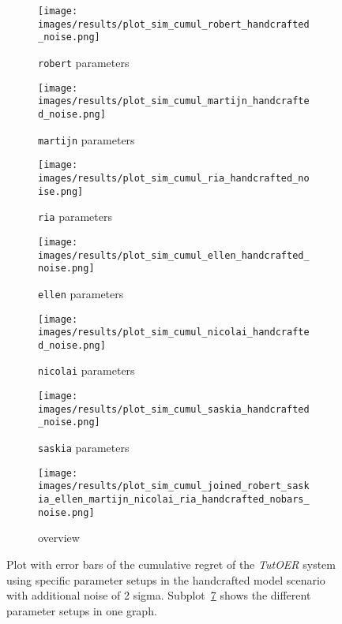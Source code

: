 
\begin{figure}[ht]
	\begin{subfigure}{0.48\linewidth}
	\texttt{[image: images/results/plot\_sim\_cumul\_robert\_handcrafted\_noise.png]}
	\caption{\texttt{robert} parameters}
	\label{fig:cumul_handcrafted_noise_robert}
	\end{subfigure}
	\hfill
	\begin{subfigure}{0.48\linewidth}
	\texttt{[image: images/results/plot\_sim\_cumul\_martijn\_handcrafted\_noise.png]}
	\caption{\texttt{martijn} parameters}
	\label{fig:cumul_handcrafted_noise_martijn}
	\end{subfigure}
	\begin{subfigure}{0.48\linewidth}
	\texttt{[image: images/results/plot\_sim\_cumul\_ria\_handcrafted\_noise.png]}
	\caption{\texttt{ria} parameters}
	\label{fig:cumul_handcrafted_noise_ria}
	\end{subfigure}
	\hfill
	\begin{subfigure}{0.48\linewidth}
	\texttt{[image: images/results/plot\_sim\_cumul\_ellen\_handcrafted\_noise.png]}
	\caption{\texttt{ellen} parameters}
	\label{fig:cumul_handcrafted_noise_ellen}
	\end{subfigure}
	\begin{subfigure}{0.48\linewidth}
	\texttt{[image: images/results/plot\_sim\_cumul\_nicolai\_handcrafted\_noise.png]}
	\caption{\texttt{nicolai} parameters}
	\label{fig:cumul_handcrafted_noise_nicolai}
	\end{subfigure}
	\hfill
	\begin{subfigure}{0.48\linewidth}
	\texttt{[image: images/results/plot\_sim\_cumul\_saskia\_handcrafted\_noise.png]}
	\caption{\texttt{saskia} parameters}
	\label{fig:cumul_handcrafted_noise_saskia}
	\end{subfigure}
	\begin{subfigure}{\linewidth}
	\texttt{[image: images/results/plot\_sim\_cumul\_joined\_robert\_saskia\_ellen\_martijn\_nicolai\_ria\_handcrafted\_nobars\_noise.png]}
	\caption{overview}
	\label{fig:cumul_handcrafted_noise_overview_group2}
	\end{subfigure}
	\caption{Plot with error bars of the cumulative regret of the \emph{TutOER}
	system using specific parameter setups in the handcrafted model scenario
	with additional noise of 2 sigma.
	Subplot~\ref{fig:cumul_handcrafted_noise_overview_group2} shows the
	different parameter setups in one graph.}
	\label{fig:cumul_handcrafted_noise_container_group2}
\end{figure}

